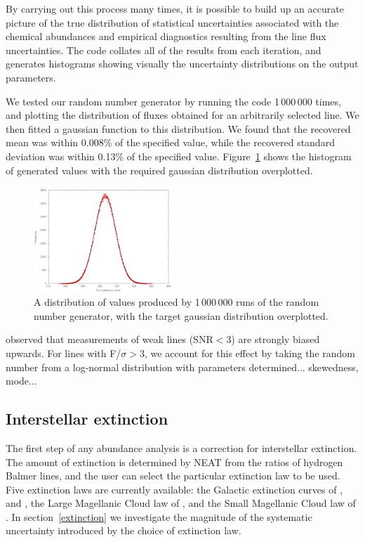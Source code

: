 \documentclass[useAMS,usenatbib]{mn2e}
\begin{document}
By carrying out this process many times, it is possible to build up an accurate picture of the true distribution of statistical uncertainties associated with the chemical abundances and empirical diagnostics resulting from the line flux uncertainties. The code collates all of the results from each iteration, and generates histograms showing visually the uncertainty distributions on the output parameters.

We tested our random number generator by running the code 1\,000\,000 times, and plotting the distribution of fluxes obtained for an arbitrarily selected line.  We then fitted a gaussian function to this distribution.  We found that the recovered mean was within 0.008\% of the specified value, while the recovered standard deviation was within 0.13\% of the specified value.  Figure~\ref{gaussiantest} shows the histogram of generated values with the required gaussian distribution overplotted.

\begin{figure}
\includegraphics[width=0.47\textwidth]{figures/gaussian_test.png}
\caption{A distribution of values produced by 1\,000\,000 runs of the random number generator, with the target gaussian distribution overplotted.}
\label{gaussiantest}
\end{figure}

\citet{1994A&A...287..676R} observed that measurements of weak lines (SNR$<$3) are strongly biased upwards.  For lines with F/$\sigma > $3, we account for this effect by taking the random number from a log-normal distribution with parameters determined... skewedness, mode...

\subsection{Interstellar extinction}

The first step of any abundance analysis is a correction for interstellar extinction.  The amount of extinction is determined by NEAT from the ratios of hydrogen Balmer lines, and the user can select the particular extinction law to be used.  Five extinction laws are currently available: the Galactic extinction curves of \citet{1983MNRAS.203..301H}, \citet{1990ApJS...72..163F} and \citet{1989ApJ...345..245C}, the Large Magellanic Cloud law of \citet{1983MNRAS.203..301H}, and the Small Magellanic Cloud law of \citet{1984A&A...132..389P}.  In section~\ref{extinction} we investigate the magnitude of the systematic uncertainty introduced by the choice of extinction law.
\end{document}
